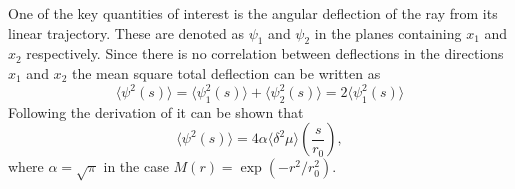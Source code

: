
One of the key quantities of interest is the angular deflection of the ray from its linear trajectory. These are denoted as $\psi_1$ and $\psi_2$ in the planes containing $x_1$ and $x_2$ respectively.
Since there is no correlation between deflections in the directions $x_1$ and $x_2$ the mean square total deflection can be written as
\begin{equation}
\label{eq:scattering_mstotaldeflection}
\langle \psi^2(s) \rangle = \langle \psi_1^2(s) \rangle + \langle \psi_2^2(s) \rangle = 2 \langle \psi_1^2(s) \rangle
\end{equation}
Following the derivation of \cite{Chandrasekhar1952} it can be shown that
\begin{equation}
\label{eq:scattering}
\langle \psi^2(s) \rangle = 4 \alpha  \langle \delta^2 \mu \rangle \left( \frac{s}{r_0} \right),
\end{equation}
where $\alpha = \sqrt{\pi}$ in the case $M(r) = \exp{(-r^2/r_0^2)}$.

